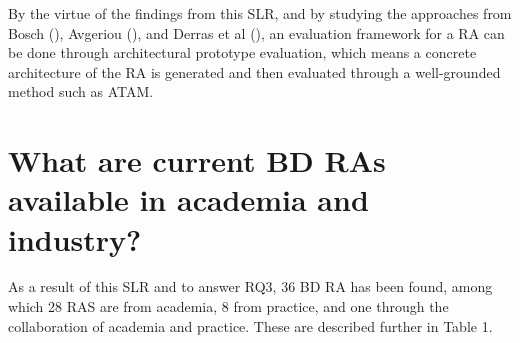 \documentclass[review]{elsarticle}
\begin{document}
By the virtue of the findings from this SLR, and by studying the approaches from Bosch (\cite{bosch2000design}), Avgeriou (\cite{avgeriou2003describing}), and Derras et al (\cite{derras2018reference}), an evaluation framework for a RA can be done through architectural prototype evaluation, which means a concrete architecture of the RA is generated and then evaluated through a well-grounded method such as ATAM.

\section{What are current BD RAs available in academia and industry?}

As a result of this SLR and to answer RQ3, 36 BD RA has been found, among which 28 RAS are from academia, 8 from practice, and one through the collaboration of academia and practice. These are described further in Table 1.
\end{document}
